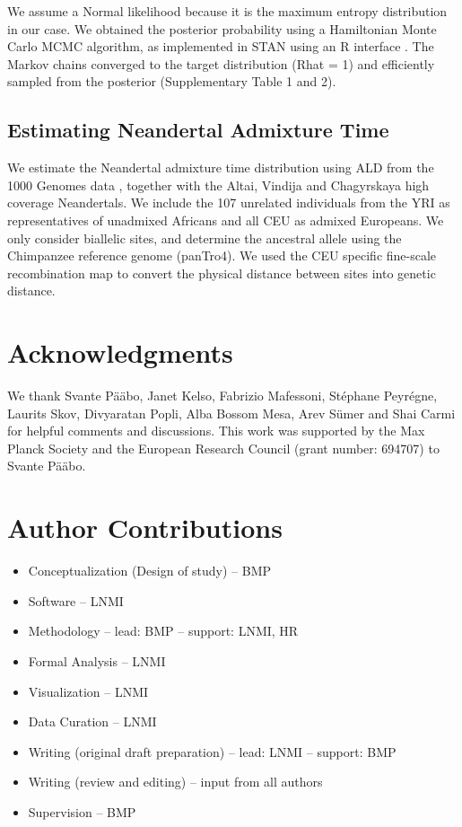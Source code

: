 \documentclass[11pt]{article}
\begin{document}
We assume a Normal likelihood because it is the maximum entropy distribution in our case. We obtained the posterior probability using a Hamiltonian Monte Carlo MCMC algorithm, as implemented in STAN \citep{carpenter_stan_2017} using an R interface \citep{stan_development_team_rstan_2018,mcelreath_statistical_2020}. The Markov chains converged to the target distribution (Rhat = 1) and efficiently sampled from the posterior (Supplementary Table 1 and 2).  


\subsection{Estimating Neandertal Admixture Time}\label{Estimating admixture time from real data}
We estimate the Neandertal admixture time distribution using ALD from the 1000 Genomes data \citep{the_1000_genomes_project_consortium_global_2015}, together with the Altai, Vindija and Chagyrskaya high coverage Neandertals. We  include the 107 unrelated individuals from the YRI as representatives of unadmixed Africans and all CEU as admixed Europeans. We only consider biallelic sites, and determine the ancestral allele using  the Chimpanzee reference genome (panTro4). We used the CEU specific fine-scale recombination map \citep{spence_inference_2019} to convert the physical distance between sites into genetic distance. 

\section{Acknowledgments}

We thank Svante P\"a\"abo, Janet Kelso, Fabrizio Mafessoni, St\'{e}phane Peyr\'{e}gne, Laurits Skov, Divyaratan Popli, Alba Bossom Mesa, Arev S\"umer and Shai Carmi for helpful comments and discussions.
This work was supported by the Max Planck Society and the European Research Council (grant number: 694707) to Svante P\"a\"abo.

\section{Author Contributions}
\begin{itemize}
    \item Conceptualization (Design of study) -- BMP
    \item Software -- LNMI
    \item Methodology -- lead: BMP -- support: LNMI, HR
    \item Formal Analysis -- LNMI
    \item Visualization -- LNMI
    \item Data Curation -- LNMI
    \item Writing (original draft preparation) -- lead: LNMI -- support: BMP
    \item Writing (review and editing) -- input from all authors
    \item Supervision -- BMP
\end{itemize}
\end{document}
